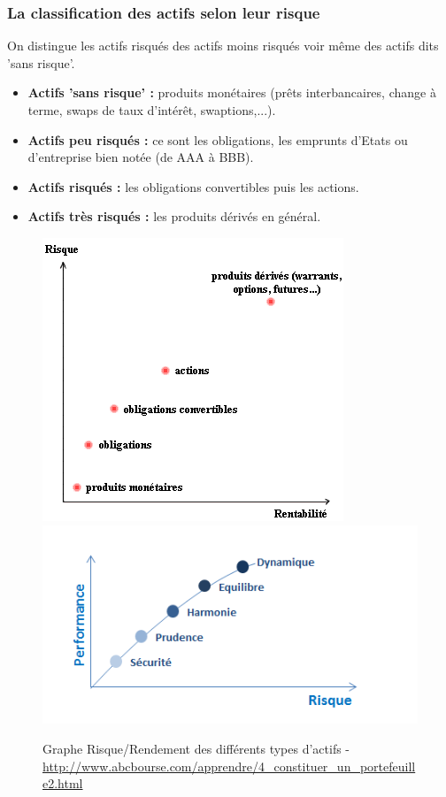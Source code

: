 \subsubsection{La classification des actifs selon leur risque}
On distingue les actifs risqués des actifs moins risqués voir même des actifs dits 'sans risque'.
\begin{itemize}
 \item \textbf{Actifs 'sans risque' :} produits monétaires (prêts interbancaires, change à terme, swaps de taux d'intérêt, swaptions,...).
 \item \textbf{Actifs peu risqués :} ce sont les obligations, les emprunts d'Etats ou d'entreprise bien notée (de AAA à BBB).
 \item \textbf{Actifs risqués :} les obligations convertibles puis les actions.
 \item \textbf{Actifs très risqués :} les produits dérivés en général.
\end{itemize}
\begin{figure}[H]
  \center
  \includegraphics[scale=0.6]{../graph/actifsRisques.png}
  \includegraphics[scale=0.6]{../graph/profilsRisque.png}
  \caption{Graphe Risque/Rendement des différents types d'actifs - \url{http://www.abcbourse.com/apprendre/4_constituer_un_portefeuille2.html}}
\end{figure}


